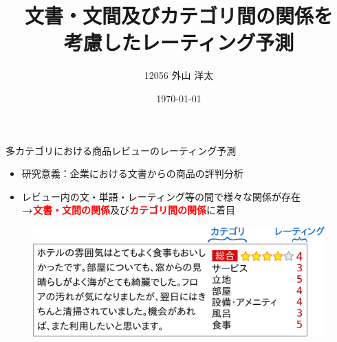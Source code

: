 \documentclass[aspectratio=43,unicode,10pt]{beamer}
\title{文書・文間及びカテゴリ間の関係を\\考慮したレーティング予測}
\institute{知能数理研究室}
\author{12056 外山 洋太}
\date{\today}
\newcommand{\fire}[1]{\textcolor{red}{\textbf{#1}}}
\newcommand{\arrow}{\textcolor{ttiblue}{\textbf{→}}\hspace{1ex}}
\begin{document}
\begin{frame}
\titlepage
\end{frame}

\begin{frame}{多カテゴリにおける商品レビューのレーティング予測}{}
  \begin{itemize}
    \item 研究意義：企業における文書からの商品の評判分析
    \item レビュー内の文・単語・レーティング等の間で様々な関係が存在 \\
          \arrow \fire{文書・文間の関係}及び\fire{カテゴリ間の関係}に着目
  \end{itemize}
  \begin{figure}
    \includegraphics[width=0.9\linewidth]{fig/review.png}
  \end{figure}
\end{frame}
\end{document}
